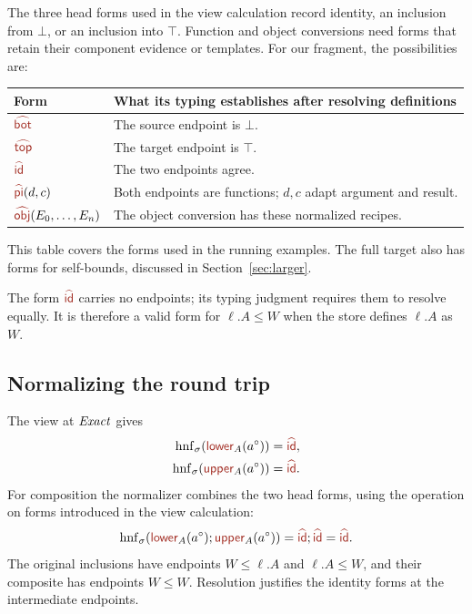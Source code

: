 \label{sec:normalization}

The three head forms used in the view calculation record identity,
an inclusion from $\bot$, or an inclusion into $\top$.
Function and object conversions need forms that retain their component
evidence or templates. For our fragment, the possibilities are:
\begin{center}
\renewcommand{\arraystretch}{1.2}
\begin{tabularx}{\linewidth}{@{}lX@{}}
\toprule
Form & What its typing establishes after resolving definitions\\
\midrule
$\form{bot}$ & The source endpoint is $\bot$.\\
$\form{top}$ & The target endpoint is $\top$.\\
$\form{id}$ & The two endpoints agree.\\
$\form{pi}(d,c)$ & Both endpoints are functions; $d,c$ adapt argument and result.\\
$\form{obj}(E_0,\ldots,E_n)$ & The object conversion has these normalized recipes.\\
\bottomrule
\end{tabularx}
\end{center}
This table covers the forms used in the running examples. The full
target also has forms for self-bounds, discussed in
Section~\ref{sec:larger}.

The form $\form{id}$ carries no endpoints; its typing judgment requires
them to resolve equally. It is therefore a valid form for $\ell.A\le W$
when the store defines $\ell.A$ as $W$.

\subsection*{Normalizing the round trip}
The view at $\mathit{Exact}$ gives
\[
 \begin{aligned}
 \hnf{\ev{lower}_A(a^\circ)}&=\form{id},\\
 \hnf{\ev{upper}_A(a^\circ)}&=\form{id}.
 \end{aligned}
\]
For composition the normalizer combines the two head forms,
using the operation on forms introduced in the view calculation:
\[
 \hnf{\ev{lower}_A(a^\circ);\ev{upper}_A(a^\circ)}
   =\form{id};\form{id}=\form{id}.
\]
The original inclusions have endpoints $W\le \ell.A$ and $\ell.A\le W$,
and their composite has endpoints $W\le W$. Resolution justifies the
identity forms at the intermediate endpoints.

